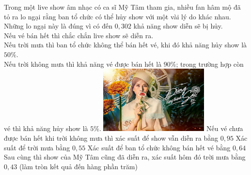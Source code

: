 \begin{ex}%
\immini
{
 Trong một live show âm nhạc có ca sĩ Mỹ Tâm tham gia, nhiều fan hâm mộ đã tỏ ra lo ngại rằng ban tổ chức có thể hủy show với một vài lý do khác nhau. Những lo ngại này là đúng vì có đến $0{,}302$ khả năng show diễn sẽ bị hủy.\\
Nếu vé bán hết thì chắc chắn live show sẽ diễn ra.\\
Nếu trời mưa thì ban tổ chức không thể bán hết vé, khi đó khả năng hủy show là $50\%$.\\
Nếu trời không mưa thì khả năng vé được bán hết là $90\%$; trong trường hợp còn vé thì khả năng hủy show là $5\%$.
}
{
 \includegraphics[width=5.5cm]{img/HXN-12-15}
}
\choiceTF
 {\True Nếu vé chưa được bán hết khi trời không mưa thì xác suất để show vẫn diễn ra bằng $0{,}95$}
 {Xác suất để trời mưa bằng $0{,}55$}
 {\True Xác suất để ban tổ chức không bán hết vé bằng $0{,}64$}
 {\True Sau cùng thì show của Mỹ Tâm cũng đã diễn ra, xác suất hôm đó trời mưa bằng $0{,}43$ (làm tròn kết quả đến hàng phần trăm)}
\end{ex}

